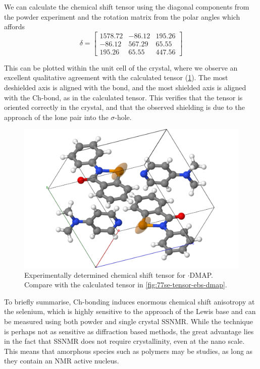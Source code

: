\begin{refsection}
We can calculate the chemical shift tensor using the diagonal components from the powder experiment and the rotation matrix from the polar angles which affords
\begin{equation}
  \delta = \begin{bmatrix} 1578.72 & -86.12 & 195.26 \\ -86.12 & 567.29 & 65.55 \\ 195.26 & 65.55 & 447.56 \end{bmatrix}
\end{equation}

This can be plotted within the unit cell of the crystal, where we observe an excellent qualitative agreement with the calculated tensor (\cref{fig:expt-tensor-ebs-dmap}).
The most deshielded axis is aligned with the  bond, and the most shielded axis is aligned with the Ch-bond, as in the calculated tensor.
This verifies that the tensor is oriented correctly in the crystal, and that the observed shielding is due to the approach of the lone pair into the $\sigma$-hole.

\begin{figure}
  \centering
  \includegraphics[width=0.7\linewidth]{Figures/expt-tensor-ebs-dmap.pdf}
  \caption{Experimentally determined chemical shift tensor for $\cdot$DMAP. Compare with the calculated tensor in \cref{fig:77se-tensor-ebs-dmap}.}
  \label{fig:expt-tensor-ebs-dmap}
\end{figure}

To briefly summarise, Ch-bonding induces enormous chemical shift anisotropy at the selenium, which is highly sensitive to the approach of the Lewis base and can be measured using both powder and single crystal SSNMR.
While the technique is perhaps not as sensitive as diffraction based methods, the great advantage lies in the fact that SSNMR does not require crystallinity, even at the nano scale.
This means that amorphous species such as polymers may be studies, as long as they contain an NMR active nucleus.


\end{refsection}
